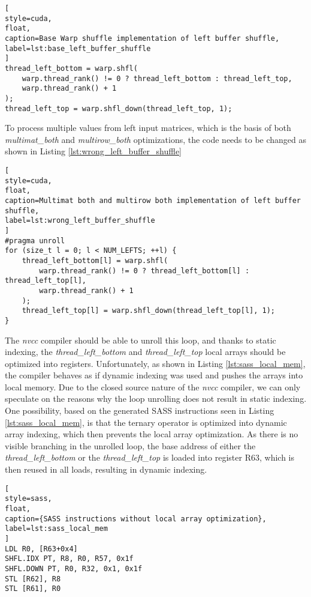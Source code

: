 \begin{lstlisting}[
style=cuda,
float,
caption=Base Warp shuffle implementation of left buffer shuffle,
label=lst:base_left_buffer_shuffle
]
thread_left_bottom = warp.shfl(
	warp.thread_rank() != 0 ? thread_left_bottom : thread_left_top,
	warp.thread_rank() + 1
);
thread_left_top = warp.shfl_down(thread_left_top, 1);
\end{lstlisting}

To process multiple values from left input matrices, which is the basis of both \textit{multimat\_both} and \textit{multirow\_both} optimizations, the code needs to be changed as shown in Listing \ref{lst:wrong_left_buffer_shuffle}

\begin{lstlisting}[
style=cuda,
float,
caption=Multimat both and multirow both implementation of left buffer shuffle,
label=lst:wrong_left_buffer_shuffle
]
#pragma unroll
for (size_t l = 0; l < NUM_LEFTS; ++l) {
	thread_left_bottom[l] = warp.shfl(
		warp.thread_rank() != 0 ? thread_left_bottom[l] : thread_left_top[l],
		warp.thread_rank() + 1
	);
	thread_left_top[l] = warp.shfl_down(thread_left_top[l], 1);
}
\end{lstlisting}

The \textit{nvcc} compiler should be able to unroll this loop, and thanks to static indexing, the \textit{thread\_left\_bottom} and \textit{thread\_left\_top} local arrays should be optimized into registers. Unfortunately, as shown in Listing \ref{lst:sass_local_mem}, the compiler behaves as if dynamic indexing was used and pushes the arrays into local memory. 
Due to the closed source nature of the \textit{nvcc} compiler, we can only speculate on the reasons why the loop unrolling does not result in static indexing. One possibility, based on the generated SASS instructions seen in Listing \ref{lst:sass_local_mem}, is that the ternary operator is optimized into dynamic array indexing, which then prevents the local array optimization. As there is no visible branching in the unrolled loop, the base address of either the \textit{thread\_left\_bottom} or the \textit{thread\_left\_top} is loaded into register R63, which is then reused in all loads, resulting in dynamic indexing. 

\begin{lstlisting}[
style=sass,
float,
caption={SASS instructions without local array optimization},
label=lst:sass_local_mem
]
LDL R0, [R63+0x4]
SHFL.IDX PT, R8, R0, R57, 0x1f
SHFL.DOWN PT, R0, R32, 0x1, 0x1f
STL [R62], R8
STL [R61], R0
\end{lstlisting}

